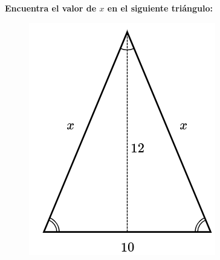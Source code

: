 \begin{multicols}{2}
    \textbf{Encuentra el valor de $x$ en el siguiente triángulo:}
    
    \begin{figure}[H]
        \centering
        \includegraphics[width=0.4\linewidth]{../images/pitagoras11.png}
    \end{figure}
\end{multicols}\vspace{-0.5cm}
